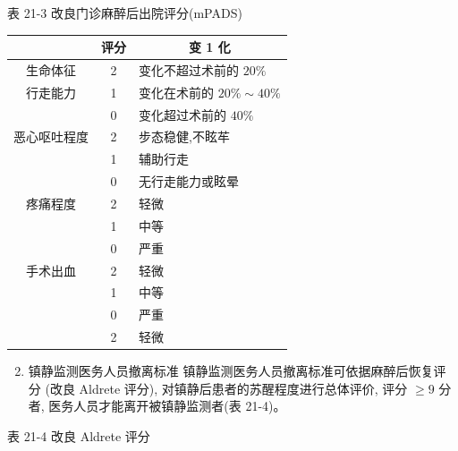 \documentclass[10pt]{article}
\begin{document}
表 21-3 改良门诊麻醉后出院评分(mPADS)

\begin{center}
\begin{tabular}{ccl}
\hline
 & 评分 & \multicolumn{1}{c}{变 1 化} \\
\hline
生命体征 & 2 & 变化不超过术前的 $20 \%$ \\
行走能力 & 1 & 变化在术前的 $20 \% \sim 40 \%$ \\
 & 0 & 变化超过术前的 $40 \%$ \\
恶心呕吐程度 & 2 & 步态稳健,不眩䒜 \\
 & 1 & 辅助行走 \\
 & 0 & 无行走能力或眩晕 \\
疼痛程度 & 2 & 轻微 \\
 & 1 & 中等 \\
 & 0 & 严重 \\
手术出血 & 2 & 轻微 \\
 & 1 & 中等 \\
 & 0 & 严重 \\
 & 2 & 轻微 \\
\hline
\end{tabular}
\end{center}

\begin{enumerate}
  \setcounter{enumi}{1}
  \item 镇静监测医务人员撤离标准 镇静监测医务人员撤离标准可依据麻醉后恢复评分 (改良 Aldrete 评分), 对镇静后患者的苏醒程度进行总体评价, 评分 $\geqslant 9$ 分者, 医务人员才能离开被镇静监测者(表 21-4)。
\end{enumerate}

表 21-4 改良 Aldrete 评分
\end{document}

